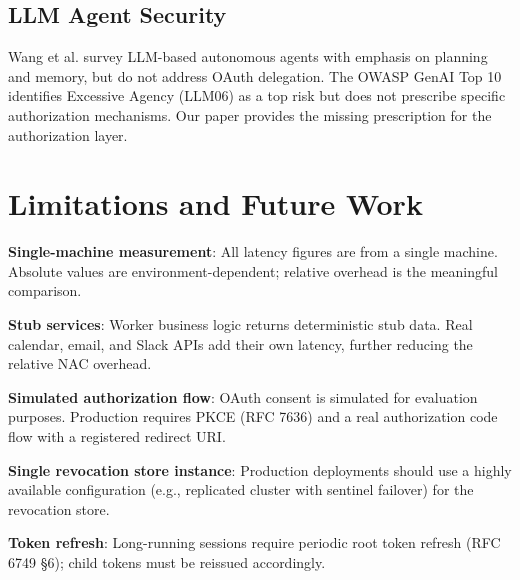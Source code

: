 \documentclass[journal]{IEEEtran}
\begin{document}
\subsection{LLM Agent Security}

Wang et al. \cite{wang2024survey} survey LLM-based autonomous agents with emphasis
on planning and memory, but do not address OAuth delegation. The OWASP GenAI Top
10 \cite{owasp_genai} identifies Excessive Agency (LLM06) as a top risk but
does not prescribe specific authorization mechanisms. Our paper provides the
missing prescription for the authorization layer.


\section{Limitations and Future Work}
\label{sec:limitations}

\textbf{Single-machine measurement}: All latency figures are from a single
machine. Absolute values are environment-dependent; relative overhead is the
meaningful comparison.

\textbf{Stub services}: Worker business logic returns deterministic stub data.
Real calendar, email, and Slack APIs add their own latency, further reducing
the relative NAC overhead.

\textbf{Simulated authorization flow}: OAuth consent is simulated for evaluation
purposes. Production requires PKCE (RFC 7636) and a real authorization code
flow with a registered redirect URI.

\textbf{Single revocation store instance}: Production deployments should use
a highly available configuration (e.g., replicated cluster with sentinel
failover) for the revocation store.

\textbf{Token refresh}: Long-running sessions require periodic root token refresh
(RFC 6749 §6); child tokens must be reissued accordingly.
\end{document}
